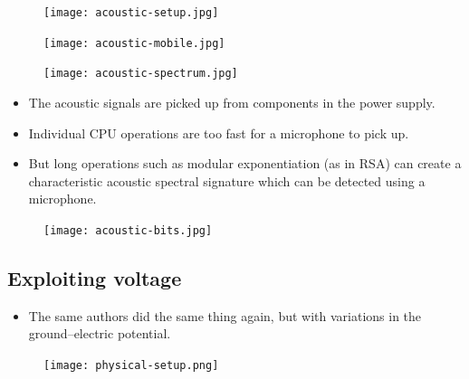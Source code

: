 \begin{frame}
  \begin{figure}
    \texttt{[image: acoustic-setup.jpg]}
  \end{figure}
  \begin{figure}
    \texttt{[image: acoustic-mobile.jpg]}
  \end{figure}
\end{frame}

\begin{frame}
  \begin{figure}
    \texttt{[image: acoustic-spectrum.jpg]}
  \end{figure}
  \begin{itemize}
    \item The acoustic signals are picked up from components in the power 
      supply.

    \item Individual CPU operations are too fast for a microphone to pick up.

    \item But long operations such as modular exponentiation (as in RSA) can 
      create a characteristic acoustic spectral signature which can be detected 
      using a microphone.
  \end{itemize}
\end{frame}

\begin{frame}
  \begin{figure}
    \texttt{[image: acoustic-bits.jpg]}
  \end{figure}
\end{frame}

\subsection{Exploiting voltage}

\begin{frame}
  \begin{itemize}
    \item The same authors did the same thing 
      again, but with variations in the ground--electric potential.
  \end{itemize}
\end{frame}

\begin{frame}
  \begin{figure}
    \texttt{[image: physical-setup.png]}
  \end{figure}
\end{frame}

